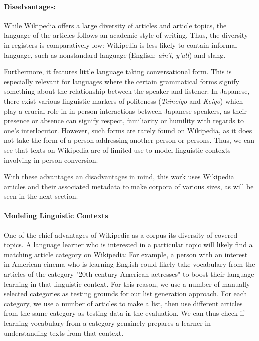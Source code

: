 \paragraph{Disadvantages:}
While Wikipedia offers a large diversity of articles and article topics, the language of the articles follows an academic style of writing.
Thus, the diversity in registers is comparatively low:
Wikipedia is less likely to contain informal language, such as nonstandard language (English: \textit{ain't}, \textit{y'all}) and slang.

Furthermore, it features little language taking conversational form.
This is especially relevant for languages where the certain grammatical forms signify something about the relationship between the speaker and listener:
In Japanese, there exist various linguistic markers of politeness (\textit{Teineigo} and \textit{Keigo}) which play a crucial role in in-person interactions between Japanese speakers, as their presence or absence can signify respect, familiarity or humility with regards to one's interlocutor.
However, such forms are rarely found on Wikipedia, as it does not take the form of a person addressing another person or persons.
Thus, we can see that texts on Wikipedia are of limited use to model linguistic contexts involving in-person conversion.

With these advantages an disadvantages in mind, this work uses Wikipedia articles and their associated metadata to make corpora of various sizes, as will be seen in the next section.

\paragraph{Modeling Linguistic Contexts}

One of the chief advantages of Wikipedia as a corpus its diversity of covered topics.
A language learner who is interested in a particular topic will likely find a matching article category on Wikipedia:
For example, a person with an interest in American cinema who is learning English could likely take vocabulary from the articles of the category "20th-century American actresses" to boost their language learning in that linguistic context.
For this reason, we use a number of manually selected categories as testing grounds for our list generation approach.
For each category, we use a number of articles to make a list, then use different articles from the same category as testing data in the evaluation.
We can thus check if learning vocabulary from a category genuinely prepares a learner in understanding texts from that context.

